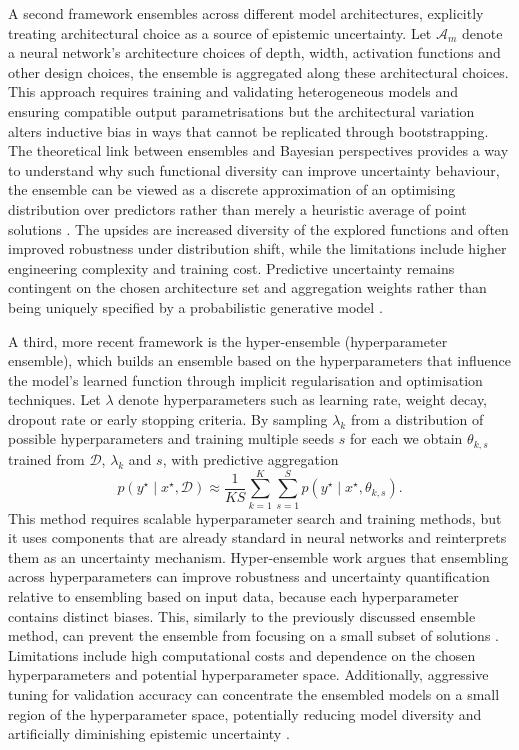 A second framework ensembles across different model architectures, explicitly treating architectural choice as a source of epistemic uncertainty. Let $\mathcal{A}_m$ denote a neural network's architecture choices of depth, width, activation functions and other design choices, the ensemble is aggregated along these architectural choices. This approach requires training and validating heterogeneous models and ensuring compatible output parametrisations but the architectural variation alters inductive bias in ways that cannot be replicated through bootstrapping. The theoretical link between ensembles and Bayesian perspectives provides a way to understand why such functional diversity can improve uncertainty behaviour, the ensemble can be viewed as a discrete approximation of an optimising distribution over predictors rather than merely a heuristic average of point solutions \cite{Wild2023}. The upsides are increased diversity of the explored functions and often improved robustness under distribution shift, while the limitations include higher engineering complexity and training cost. Predictive uncertainty remains contingent on the chosen architecture set and aggregation weights rather than being uniquely specified by a probabilistic generative model \cite{Wild2023,Lakshminarayanan2017}.

A third, more recent framework is the hyper-ensemble (hyperparameter ensemble), which builds an ensemble based on the hyperparameters that influence the model's learned function through implicit regularisation and optimisation techniques. Let $\lambda$ denote hyperparameters such as learning rate, weight decay, dropout rate or early stopping criteria. By sampling $\lambda_k$ from a distribution of possible hyperparameters and training multiple seeds $s$ for each we obtain $\theta_{k,s}$ trained from \(\mathcal{D}\), \(\lambda_k\) and \(s\), with predictive aggregation
\begin{equation}
p(y^\star \mid x^\star, \mathcal{D})
\approx
\frac{1}{KS}\sum_{k=1}^K \sum_{s=1}^S p\!\left(y^\star \mid x^\star, \theta_{k,s}\right).
\end{equation}
This method requires scalable hyperparameter search and training methods, but it uses components that are already standard in neural networks and reinterprets them as an uncertainty mechanism. Hyper-ensemble work argues that ensembling across hyperparameters can improve robustness and uncertainty quantification relative to ensembling based on input data, because each hyperparameter contains distinct biases. This, similarly to the previously discussed ensemble method, can prevent the ensemble from focusing on a small subset of solutions \cite{Wenzel2021}. Limitations include high computational costs and dependence on the chosen hyperparameters and potential hyperparameter space. Additionally, aggressive tuning for validation accuracy can concentrate the ensembled models on a small region of the hyperparameter space, potentially reducing model diversity and artificially diminishing epistemic uncertainty \cite{Wenzel2021}.

